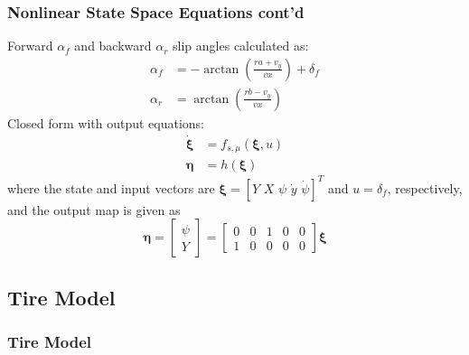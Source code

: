 \documentclass{beamer}
\renewcommand{\cite}[1]{\footnote<.->[frame]{\fullcite{#1}}}
\begin{document}
\begin{frame}
	\frametitle{Nonlinear State Space Equations cont'd}
	Forward $\alpha_{f}$ and backward $\alpha_{r}$ slip angles calculated as:
	\begin{subequations} 
		\begin{align} \alpha_{f} &= -\arctan(\frac{ra + v_y}{vx}) + \delta_{f} \label{eqn:front_slip_angle} \\
		\alpha_{r} &= \arctan(\frac{rb - v_y}{vx})\label{eqn:rear_slip_angle} 
		\end{align} 
	\end{subequations}
	Closed form with output equations:
	\begin{subequations} 
		\label{eqn:nonlinear_system_dynamics}
		\begin{align} 
		\dot{\bm{\xi}} &= f_{s,\mu}(\bm{\xi},u) \\
		\bm{\eta} &= h(\bm{\xi})
		\end{align} 
	\end{subequations}
	where the state and input vectors are $\bm{\xi}=[Y\,\,X\,\,{\psi}\,\,\dot{y}\,\,\dot{\psi}]^{T}$ and $u=\delta_{f}$, respectively, and the output map is given as
	\begin{equation}
		\label{eqn:output_eqn}
		{\bm{\eta}} = \begin{bmatrix}
		\psi\\ Y
		\end{bmatrix} = \begin{bmatrix}
		0 & 0 & 1 & 0 & 0\\
		1 & 0 & 0 & 0 & 0 
		\end{bmatrix} \bm{\xi}
	\end{equation}
\end{frame}

\subsection{Tire Model}
\begin{frame}
	\frametitle{Tire Model}
\end{frame}
\end{document}
